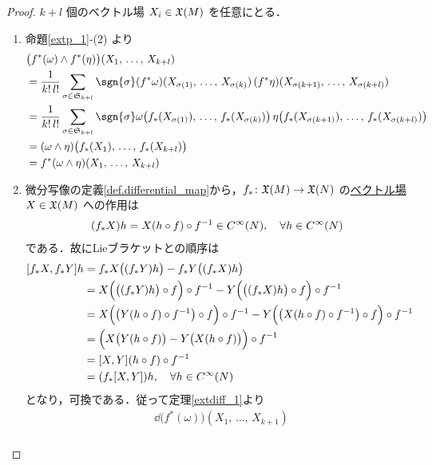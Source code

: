 \documentclass[geometry_main]{subfiles}
\begin{document}
\begin{proof} 
	$k+l$ 個のベクトル場 $X_i \in \mathfrak{X}(M)$ を任意にとる．
	\begin{enumerate} 
		\item 命題\ref{extp_1}-(2) より
		\begin{align} 
			&\bigl( f^*(\omega) \wedge f^*(\eta) \bigr)(X_1,\, \dots ,\, X_{k+l}) \\
			&= \frac{1}{k!\, l!} \sum_{\sigma \in \mathfrak{S}_{k+l}} \sgn{\sigma} (f^* \omega)(X_{\sigma(1)},\, \dots ,\, X_{\sigma(k)})\, (f^* \eta)(X_{\sigma(k+1)},\, \dots ,\, X_{\sigma(k+l)}) \\
			&= \frac{1}{k!\, l!} \sum_{\sigma \in \mathfrak{S}_{k+l}} \sgn{\sigma} \omega\bigl(f_*(X_{\sigma(1)}),\, \dots ,\, f_*(X_{\sigma(k)}) \bigr)\, \eta\bigl( f_*(X_{\sigma(k+1)}),\, \dots ,\, f_*(X_{\sigma(k+l)})\bigr) \\
			&= (\omega \wedge \eta)\bigl( f_*(X_1),\, \dots ,\, f_*(X_{k+l}) \bigr) \\
			&= f^*(\omega \wedge \eta)(X_1,\, \dots ,\, X_{k+l})
		\end{align}
		\item 微分写像の定義\eqref{def.differential_map}から，$f_* \colon \mathfrak{X}(M) \to \mathfrak{X}(N)$ の\underline{ベクトル場} $X \in \mathfrak{X}(M)$ への作用は
		\begin{align} 
			(f_* X) h = X(h \circ f) \circ f^{-1} \in C^\infty(N),\quad \forall h \in C^\infty(N)
		\end{align}
		である．故にLieブラケットとの順序は
		\begin{align} 
			\comm{f_*X}{f_*Y} h &= f_* X \bigl((f_* Y) h\bigr) - f_*Y \bigl( (f_* X) h\bigr) \\
			&= X \Bigl( \bigl((f_* Y) h\bigr) \circ f \Bigr) \circ f^{-1} - Y \Bigl( \bigl((f_* X) h\bigr) \circ f \Bigr) \circ f^{-1} \\
			&= X \Bigl( \bigl(Y(h \circ f) \circ f^{-1}\bigr) \circ f \Bigr) \circ f^{-1} - Y \Bigl( \bigl(X(h \circ f) \circ f^{-1}\bigr) \circ f \Bigr) \circ f^{-1} \\
			&= \Bigl( X \bigl( Y(h \circ f)\bigr) - Y \bigl( X(h \circ f) \bigr) \Bigr) \circ f^{-1} \\
			&= \comm{X}{Y}(h \circ f) \circ f^{-1} \\
			&= (f_*\comm{X}{Y})h,\quad \forall h \in \cinftyf{N}
		\end{align}
		となり，可換である．従って定理\ref{extdiff_1}より
		\begin{align} 
			&\dd{\bigl( f^*(\omega) \bigr)} (X_1,\, \dots ,\, X_{k+1}) \\

\end{align}
\end{enumerate}
\end{proof}
\end{document}
